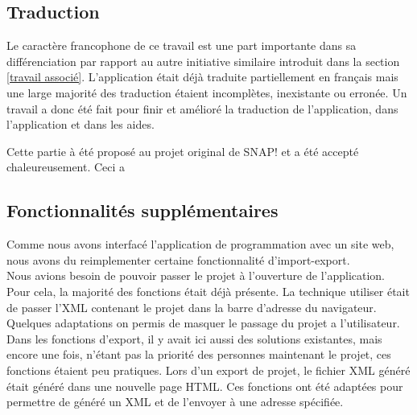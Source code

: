 \subsection{Traduction}
Le caractère francophone de ce travail est une part importante dans sa différenciation par rapport au autre initiative similaire introduit dans la section \ref{travail associé}. L'application était déjà traduite partiellement en français mais une large majorité des traduction étaient incomplètes, inexistante ou erronée. Un travail a donc été fait pour finir et amélioré la traduction de l'application, dans l'application et dans les aides.

Cette partie à été proposé au projet original de SNAP! et a été accepté chaleureusement. Ceci a 

\subsection{Fonctionnalités supplémentaires}
Comme nous avons interfacé l'application de programmation avec un site web, nous avons du reimplementer certaine fonctionnalité d'import-export.\\

Nous avions besoin de pouvoir passer le projet à l'ouverture de l'application. Pour cela, la majorité des fonctions était déjà présente. La technique utiliser était de passer l'XML contenant le projet dans la barre d'adresse du navigateur. Quelques adaptations on permis de masquer le passage du projet a l'utilisateur.\\

Dans les fonctions d'export, il y avait ici aussi des solutions existantes, mais encore une fois, n'étant pas la priorité des personnes maintenant le projet, ces fonctions étaient peu pratiques. Lors d'un export de projet, le fichier XML généré était généré dans une nouvelle page HTML. Ces fonctions ont été adaptées pour permettre de généré un XML et de l'envoyer à une adresse spécifiée.


